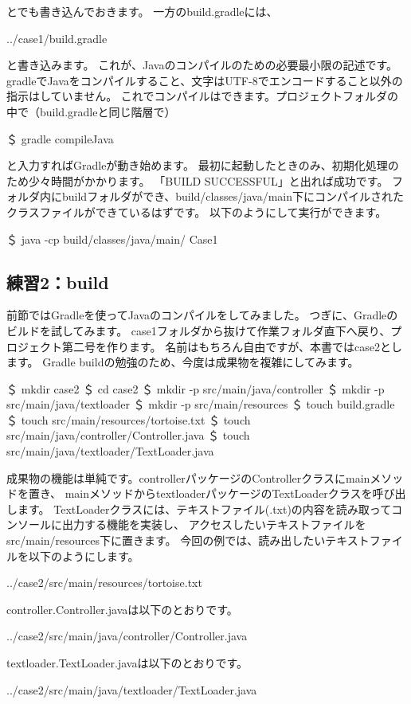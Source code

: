 \documentclass[a4paper,12pt]{article}
\begin{document}
\newpage
とでも書き込んでおきます。
一方のbuild.gradleには、
\begin{lstinputlisting}[language=Java,caption=build.gradle]
{../case1/build.gradle}
\end{lstinputlisting}
と書き込みます。
これが、Javaのコンパイルのための必要最小限の記述です。
gradleでJavaをコンパイルすること、文字はUTF-8でエンコードすること以外の指示はしていません。
これでコンパイルはできます。プロジェクトフォルダの中で（build.gradleと同じ階層で）
\begin{shell}
＄ gradle compileJava
\end{shell}
と入力すればGradleが動き始めます。
最初に起動したときのみ、初期化処理のため少々時間がかかります。
「BUILD SUCCESSFUL」と出れば成功です。
フォルダ内にbuildフォルダができ、build/classes/java/main下にコンパイルされたクラスファイルができているはずです。
以下のようにして実行ができます。
\begin{shell}[起動確認]
＄ java -cp build/classes/java/main/ Case1
\end{shell}

\newpage
\subsection{練習2：build}

前節ではGradleを使ってJavaのコンパイルをしてみました。
つぎに、Gradleのビルドを試してみます。
case1フォルダから抜けて作業フォルダ直下へ戻り、プロジェクト第二号を作ります。
名前はもちろん自由ですが、本書ではcase2とします。
Gradle buildの勉強のため、今度は成果物を複雑にしてみます。
\begin{shell}
＄ mkdir case2
＄ cd case2
＄ mkdir -p src/main/java/controller
＄ mkdir -p src/main/java/textloader
＄ mkdir -p src/main/resources
＄ touch build.gradle
＄ touch src/main/resources/tortoise.txt
＄ touch src/main/java/controller/Controller.java
＄ touch src/main/java/textloader/TextLoader.java
\end{shell}
成果物の機能は単純です。controllerパッケージのControllerクラスにmainメソッドを置き、
mainメソッドからtextloaderパッケージのTextLoaderクラスを呼び出します。
TextLoaderクラスには、テキストファイル(.txt)の内容を読み取ってコンソールに出力する機能を実装し、
アクセスしたいテキストファイルをsrc/main/resources下に置きます。
今回の例では、読み出したいテキストファイルを以下のようにします。
\begin{lstinputlisting}[caption=src/main/resources/tortoise.txt]
	{../case2/src/main/resources/tortoise.txt}
\end{lstinputlisting}
controller.Controller.javaは以下のとおりです。
\begin{lstinputlisting}[caption=src/main/java/controller/Controller.java]
	{../case2/src/main/java/controller/Controller.java}
\end{lstinputlisting}
\newpage
textloader.TextLoader.javaは以下のとおりです。
\begin{lstinputlisting}[caption=src/main/java/textloader/TextLoader.java]
	{../case2/src/main/java/textloader/TextLoader.java}
\end{lstinputlisting}
\end{document}
